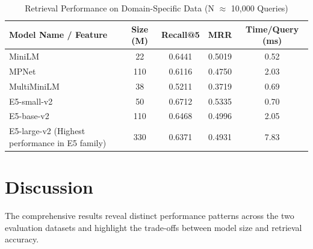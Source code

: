 \documentclass[11pt, a4paper]{article}
\begin{document}
\begin{table}[htbp]
    \centering
    \caption{Retrieval Performance on Domain-Specific Data (N $\approx$ 10,000 Queries)}
    \label{tab:domain_results}
    \begin{tabular}{p{4.5cm}cccc}
        \toprule
        \textbf{Model Name / Feature} & \textbf{Size (M)} & \textbf{Recall@5} & \textbf{MRR} & \textbf{Time/Query (ms)} \\
        \midrule
        MiniLM & 22 & 0.6441 & 0.5019 & 0.52 \\
        MPNet & 110 & 0.6116 & 0.4750 & 2.03 \\
        MultiMiniLM & 38 & 0.5211 & 0.3719 & 0.69 \\
        E5-small-v2 & 50 & 0.6712 & 0.5335 & 0.70 \\
        E5-base-v2 & 110 & 0.6468 & 0.4996 & 2.05 \\
        E5-large-v2 (Highest performance in E5 family) & 330 & 0.6371 & 0.4931 & 7.83 \\
        \bottomrule
    \end{tabular}
\end{table}

\section{Discussion}
The comprehensive results reveal distinct performance patterns across the two evaluation datasets and highlight the trade-offs between model size and retrieval accuracy.
\end{document}
